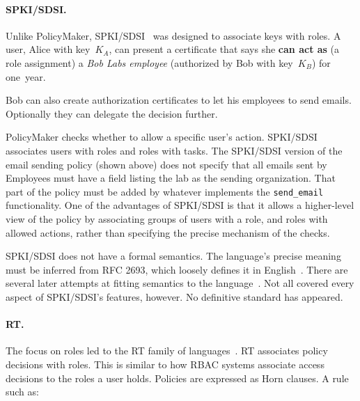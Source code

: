 \documentclass[thesis.tex]{subfiles}
\begin{document}
\paragraph*{SPKI/SDSI.}
Unlike PolicyMaker, SPKI/SDSI~\cite{ellison_spki_1999} was
designed to associate keys with roles.  A user, Alice with key~$K_A$,
can present a certificate that says she \textbf{can act as} (a role assignment) a \emph{Bob Labs
employee} (authorized by Bob with key~$K_B$) for one~year.

\noindent{}

Bob can also create authorization certificates to let his employees
to send emails. Optionally they can delegate the decision further.

\noindent{}

PolicyMaker checks whether to allow a specific user's action. SPKI/SDSI associates users with roles and
roles with tasks. The SPKI/SDSI version of the email sending policy (shown above) does not
specify that all emails sent by Employees must have a field listing the lab as
the sending organization. That part of the policy must be added by
whatever implements the \texttt{send\_email} functionality. One of the
advantages of SPKI/SDSI is that it allows a higher-level view of the policy by
associating groups of users with a role, and roles with allowed actions, rather than specifying the precise mechanism of the checks.

SPKI/SDSI does not have a formal semantics.  The language's precise
meaning must be inferred from RFC 2693, which loosely defines it in
English~\cite{ellison_spki_1999}. There are several later attempts at
fitting semantics to the
language~\cite{joseph_y._halpern_logic_1999,abadi_sdsis_1998,howell_formal_2000,dwaine_clarke_certificate_2001}.
Not all covered every aspect of SPKI/SDSI's features, however. No
definitive standard has appeared.

\paragraph*{RT.}
The focus on roles led to the RT family of
languages~\cite{ninghui_li_design_2002}. RT associates policy
decisions with roles. This is similar to how \ac{RBAC} systems associate access
decisions to the roles a user holds.  Policies are expressed as Horn
clauses.  A rule such as:
\end{document}
